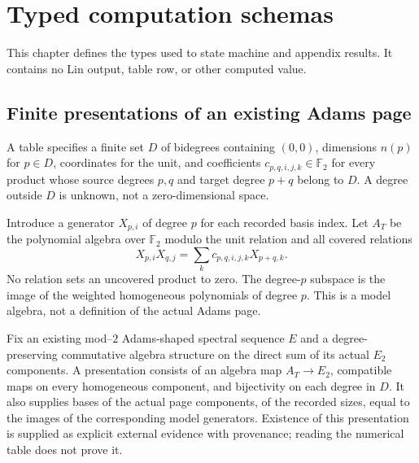 \chapter{Typed computation schemas}
\label{chap:computation-schema}

This chapter defines the types used to state machine and appendix results.  It contains no Lin output, table row, or other computed value.

\section{Finite presentations of an existing Adams page}

\begin{definition}
  \label{def:adams-e2-basis-table}
  A table specifies a finite set $D$ of bidegrees containing $(0,0)$,
  dimensions $n(p)$ for $p\in D$, coordinates for the unit, and coefficients
  $c_{p,q,i,j,k}\in\mathbb F_2$ for every product whose source degrees
  $p,q$ and target degree $p+q$ belong to $D$.
  A degree outside $D$ is unknown, not a zero-dimensional space.
\end{definition}

\begin{definition}
  \label{def:adams-e2-table-model}
  Introduce a generator $X_{p,i}$ of degree $p$ for each recorded basis
  index.  Let $A_T$ be the polynomial algebra over $\mathbb F_2$ modulo
  the unit relation and all covered relations
  \[
    X_{p,i}X_{q,j}=\sum_k c_{p,q,i,j,k}X_{p+q,k}.
  \]
  No relation sets an uncovered product to zero.  The degree-$p$ subspace
  is the image of the weighted homogeneous polynomials of degree $p$.
  This is a model algebra, not a definition of the actual Adams page.
\end{definition}

\begin{definition}
  \label{def:adams-e2-table-presentation}
  Fix an existing mod--$2$ Adams-shaped spectral sequence $E$ and a
  degree-preserving commutative algebra structure on the direct sum of its
  actual $E_2$ components.  A presentation consists of an algebra map
  $A_T\to E_2$, compatible maps on every homogeneous component, and
  bijectivity on each degree in $D$.  It also supplies bases of the actual
  page components, of the recorded sizes, equal to the images of the
  corresponding model generators.  Existence of this presentation is
  supplied as explicit external evidence with provenance; reading the
  numerical table does not prove it.
\end{definition}

